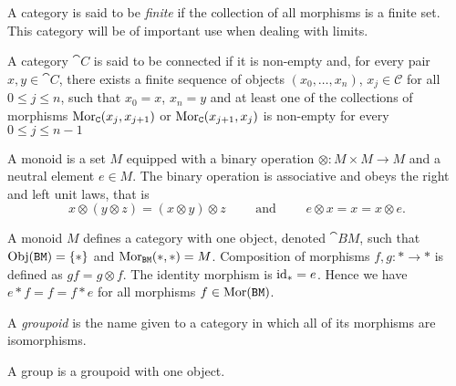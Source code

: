 \begin{definition}
\label{def:finite-category}
A category is said to be \emph{finite} if the collection of all morphisms is a
finite set. This category will be of important use when dealing with limits.
\end{definition}

\begin{definition}
\label{def:connected-category}
A category \(\cat C\) is said to be connected if it is non-empty and, for every
pair \(x, y \in \cat C\), there exists a finite sequence of objects \((x_0,
\dots, x_n)\), \(x_j \in \mathcal C\) for all \(0 \leq j \leq n\), such that
\(x_0 = x\), \(x_n = y\) and at least one of the collections of morphisms
\(\operatorname{Mor}_{\texttt C}(x_j, x_{j+1})\) or \(\operatorname{Mor}_{\texttt C}(x_{j+1}, x_j)\) is non-empty
for every \(0 \leq j \leq n - 1\)
\end{definition}


\begin{definition}[Monoid]\label{def: monoid}
A monoid is a set \(M\) equipped with a binary operation \(\otimes: M \times M
\to M\) and a neutral element \(e \in M\). The binary operation is associative
and obeys the right and left unit laws, that is
\[
  x \otimes (y \otimes z) = (x \otimes y) \otimes z \qquad \text{ and } \qquad
  e \otimes x = x = x \otimes e.
\]
\end{definition}

\begin{example}
A monoid \(M\) defines a category with one object, denoted \(\cat{BM}\), such
that \(\operatorname{Obj}(\texttt{BM}) = \{*\}\) and \(\operatorname{Mor}_{\texttt{BM}}(*, *) =
M\). Composition of morphisms \(f, g: * \to *\) is defined as \(g f = g
\otimes f\). The identity morphism is \(\operatorname{id}_* = e\). Hence we have \(e * f = f =
f * e\) for all morphisms \(f \in \operatorname{Mor}(\texttt{BM})\).
\end{example}

\begin{definition}[Groupoids]\label{def: groupoids}
A \emph{groupoid} is the name given to a category in which all of its
morphisms are isomorphisms.
\end{definition}

\begin{definition}[Group]\label{def: group}
A group is a groupoid with one object.
\end{definition}

